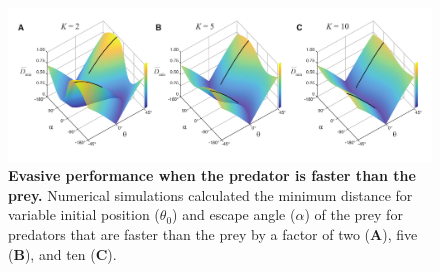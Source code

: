 \documentclass[12pt]{article}
\begin{document}
\pagebreak
\begin{figure}[t] 
\begin{centering}
\includegraphics[width=1.1\textwidth]{Fig_04.pdf}
\centering	
\caption{
\textbf{Evasive performance when the predator is faster than the
prey.} Numerical simulations calculated the minimum distance for variable initial position ($\theta_0$) and escape angle ($\alpha$) of the prey for predators that are faster than the prey by a factor of two (\textbf{A}), five (\textbf{B}), and ten (\textbf{C}).
}
\label{k>1_topo}
\end{centering}
\end{figure}





\end{document}
